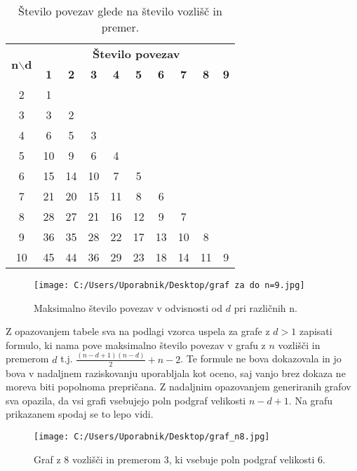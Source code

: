 \documentclass[12pt,a4paper]{amsart}
\theoremstyle{definition} %
\theoremstyle{plain} %
\begin{document}
\begin{table}[h]
    \centering
    \begin{tabular}{|c|*{9}{c|}} 
    \hline
    \multirow{2}{*}{\textbf{n$\backslash$d}} & \multicolumn{9}{c|}{\textbf{Število povezav}} \\ \cline{2-10}
    & \textbf{1} & \textbf{2} & \textbf{3} & \textbf{4} & \textbf{5} & \textbf{6} & \textbf{7} & \textbf{8} & \textbf{9} \\ 
    \hline
    2 & 1 & & & & & & & & \\ 
    3 & 3 & 2 & & & & & & & \\ 
    4 & 6 & 5 & 3 & & & & & & \\
    5 & 10 & 9 & 6 & 4 & & & & & \\
    6 & 15 & 14 & 10 & 7 & 5 & & & & \\ 
    7 & 21 & 20 & 15 & 11 & 8 & 6 & & & \\ 
    8 & 28 & 27 & 21 & 16 & 12 & 9 & 7 & & \\ 
    9 & 36 & 35 & 28 & 22 & 17 & 13 & 10 & 8 & \\ 
    10 & 45 & 44 & 36 & 29 & 23 & 18 & 14 & 11 & 9 \\ 
    \hline
    \end{tabular}
    \caption{Število povezav glede na število vozlišč in premer.}
    \label{tab:tabela1}
\end{table}

\begin{figure}[h]
    \centering
    \texttt{[image: C:/Users/Uporabnik/Desktop/graf za do n=9.jpg]}
    \caption{Maksimalno število povezav v odvisnosti od \(d\) pri različnih n.}
    \label{fig:slika1}
\end{figure}

\pagebreak
\noindent Z opazovanjem tabele sva na podlagi vzorca uspela za grafe z $d > 1$ zapisati formulo, ki nama pove
maksimalno število povezav v grafu z $n$ vozlišči in premerom $d$ t.j. $\frac{(n - d + 1)(n - d)}{2} + n - 2$. Te formule
ne bova dokazovala in jo bova v nadaljnem raziskovanju uporabljala kot oceno, saj vanjo brez dokaza ne moreva biti
popolnoma prepričana. \newline 
Z nadaljnim opazovanjem generiranih grafov sva opazila, da vsi grafi vsebujejo poln podgraf velikosti $n - d + 1$. Na grafu prikazanem spodaj
se to lepo vidi. \\

\begin{figure}[h]
    \centering
    \texttt{[image: C:/Users/Uporabnik/Desktop/graf\_n8.jpg]} %
    \caption{Graf z 8 vozlišči in premerom 3, ki vsebuje poln podgraf velikosti 6.}
    \label{fig:slika2}
\end{figure}
\end{document}
